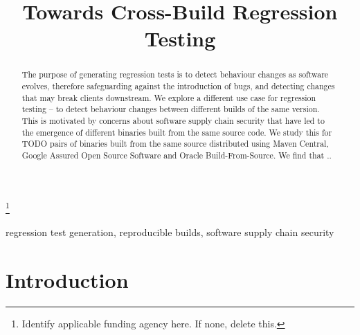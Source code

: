 \documentclass[conference]{IEEEtran}
\begin{document}
\title{Towards Cross-Build Regression Testing}
\thanks{Identify applicable funding agency here. If none, delete this.}

\author{
\and
{}
\and
{}
}

\maketitle

\begin{abstract}
	The purpose of generating regression tests is to detect behaviour changes as software evolves, therefore safeguarding against the introduction of bugs, and detecting changes that may break  clients downstream. We explore a different use case for regression testing – to detect behaviour changes  between different builds of the same version. This is motivated by concerns about software supply chain security that have led to the emergence of different binaries built from the same source code. We study this for TODO pairs of binaries built from the same source distributed using Maven Central, Google Assured Open Source Software and Oracle Build-From-Source. 
We find that ..

\end{abstract}

\begin{IEEEkeywords}
regression test generation, reproducible builds, software supply chain security
\end{IEEEkeywords}

\section{Introduction}
\end{document}
